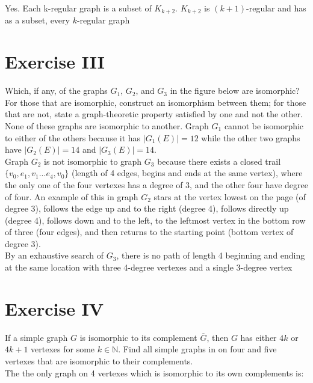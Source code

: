 \documentclass[fontsize=11pt]{scrartcl} %
\numberwithin{equation}{section} %
\numberwithin{figure}{section} %
\numberwithin{table}{section} %
\begin{document}
	Yes.  Each k-regular graph is a subset of $K_{k+2}$.  $K_{k+2}$ is $(k+1)$-regular and has as a subset, every $k$-regular graph 


\section*{Exercise III} Which, if any, of the graphs $G_1$, $G_2$, and $G_3$ in the figure below are isomorphic? For those that are isomorphic, construct an isomorphism between them; for those that are not, state a graph-theoretic property satisfied by one and not the other. \\
		
		None of these graphs are isomorphic to another.  Graph $G_1$ cannot be isomorphic to either of the others because it has $|G_1(E)| = 12$ while the other two graphs have $|G_2(E)| = 14$ and $|G_3(E)| = 14$.\\  
		
		Graph $G_2$ is not isomorphic to graph $G_3$ because there exists a closed trail $\{v_0, e_1, v_1 ... e_4, v_0\}$ (length of 4 edges, begins and ends at the same vertex), where the only one of the four vertexes has a degree of 3, and the other four have degree of four.  An example of this in graph $G_2$ stars at the vertex lowest on the page (of degree 3), follows the edge up and to the right (degree 4), follows directly up (degree 4), follows down and to the left, to the leftmost vertex in the bottom row of three (four edges), and then returns to the starting point (bottom vertex of degree 3).  \\
		
		By an exhaustive search of $G_3$, there is no path of length 4 beginning and ending at the same location with three 4-degree vertexes and a single 3-degree vertex

\section*{Exercise IV}
			If a simple graph $G$ is isomorphic to its complement $\overline G$, then $G$ has either $4k$ or $4k+1$ vertexes for some $k \in \mathbb{N}$.  Find all simple graphs in on four and five vertexes that are isomorphic to their complements.\\
			
			The the only graph on 4 vertexes which is isomorphic to its own complements is:
			
			
			
\end{document}

